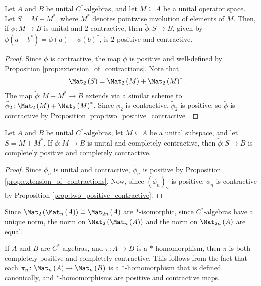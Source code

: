 \begin{proposition}
  Let $A$ and $B$ be unital $C^{\ast}$-algebras, and let $M\subseteq A$ be a unital operator space. Let $S = M + M^{\ast}$, where $M^{\ast}$ denotes pointwise involution of elements of $M$. Then, if $\phi\colon M\rightarrow B$ is unital and $2$-contractive, then $\widetilde{\phi}\colon S\rightarrow B$, given by $\widetilde{\phi}\left( a + b^{\ast} \right) = \phi\left( a \right) + \phi\left( b \right)^{\ast}$, is $2$-positive and contractive.
\end{proposition}
\begin{proof}
  Since $\phi$ is contractive, the map $\widetilde{\phi}$ is positive and well-defined by Proposition \ref{prop:extension_of_contractions}. Note that
  \begin{align*}
    \Mat_2\left( S \right) &= \Mat_2\left( M \right) + \Mat_2\left( M \right)^{\ast}.
  \end{align*}
  The map $\widetilde{\phi}\colon M + M^{\ast}\rightarrow B$ extends via a similar scheme to $\widetilde{\phi}_2\colon \Mat_2\left( M \right) + \Mat_2\left( M \right)^{\ast}$. Since $\phi_2$ is contractive, $\widetilde{\phi}_2$ is positive, so $\widetilde{\phi}$ is contractive by Proposition \ref{prop:two_positive_contractive}.
\end{proof}
\begin{proposition}
  Let $A$ and $B$ be unital $C^{\ast}$-algebras, let $M\subseteq A$ be a unital subspace, and let $S = M + M^{\ast}$. If $\phi\colon M\rightarrow B$ is unital and completely contractive, then $\widetilde{\phi}\colon S\rightarrow B$ is completely positive and completely contractive.
\end{proposition}
\begin{proof}
  Since $\phi_n$ is unital and contractive, $\widetilde{\phi}_n$ is positive by Proposition \ref{prop:extension_of_contractions}. Now, since $\left( \widetilde{\phi}_n \right)_{2}$ is positive, $\widetilde{\phi}_n$ is contractive by Proposition \ref{prop:two_positive_contractive}. 
\end{proof}
\begin{remark}
  Since $\Mat_{2}\left( \Mat_n\left( A \right) \right)\cong \Mat_{2n}\left( A \right)$ are $\ast $-isomorphic, since $C^{\ast}$-algebras have a unique norm, the norm on $\Mat_{2}\left( \Mat_n\left( A \right) \right)$ and the norm on $\Mat_{2n}\left( A \right)$ are equal.
\end{remark}
\begin{example}
  If $A$ and $B$ are $C^{\ast}$-algebras, and $\pi\colon A\rightarrow B$ is a $\ast$-homomorphism, then $\pi$ is both completely positive and completely contractive. This follows from the fact that each $\pi_n\colon \Mat_n\left( A \right)\rightarrow \Mat_n\left( B \right)$ is a $\ast$-homomorphism that is defined canonically, and $\ast$-homomorphisms are positive and contractive maps.
\end{example}

